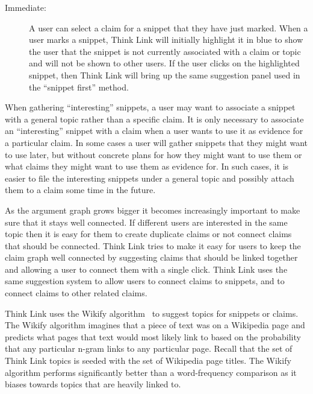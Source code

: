 \documentclass{chi2009}
\begin{document}
\begin{description}
\item[Immediate:] A user can select a claim for a snippet that they have just marked. When a user marks a snippet, Think Link will initially highlight it in blue to show the user that the snippet is not currently associated with a claim or topic and will not be shown to other users. If the user clicks on the highlighted snippet, then Think Link will bring up the same suggestion panel used in the ``snippet first'' method.
\end{description}

When gathering ``interesting'' snippets, a user may want to associate a snippet with a general topic rather than a specific claim. It is only necessary to associate an ``interesting'' snippet with a claim when a user wants to use it as evidence for a particular claim. In some cases a user will gather snippets that they might want to use later, but without concrete plans for how they might want to use them or what claims they might want to use them as evidence for. In such cases, it is easier to file the interesting snippets under a general topic and possibly attach them to a claim some time in the future. 

As the argument graph grows bigger it becomes increasingly important to make sure that it stays well connected. If different users are interested in the same topic then it is easy for them to create duplicate claims or not connect claims that should be connected. Think Link tries to make it easy for users to keep the claim graph well connected by suggesting claims that should be linked together and allowing a user to connect them with a single click. Think Link uses the same suggestion system to allow users to connect claims to snippets, and to connect claims to other related claims. 

Think Link uses the Wikify algorithm~\cite{Mihalcea2007} to suggest topics for snippets or claims. The Wikify algorithm imagines that a piece of text was on a Wikipedia page and predicts what pages that text would most likely link to based on the probability that any particular n-gram links to any particular page. Recall that the set of Think Link topics is seeded with the set of Wikipedia page titles. The Wikify algorithm performs significantly better than a word-frequency comparison as it biases towards topics that are heavily linked to.
\end{document}
